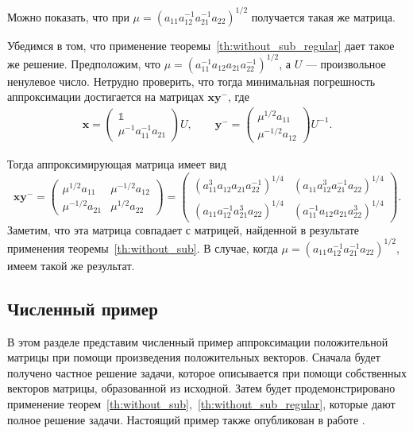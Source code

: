 \documentclass[specialist,
               substylefile = spbu.rtx,
               subf,href,colorlinks=true, 12pt]{disser}
\theoremstyle{definition}
\begin{document}
Можно показать, что при $\mu=(a_{11}a_{12}^{-1}a_{21}^{-1}a_{22})^{1/2}$ получается такая же матрица.

Убедимся в том, что применение теоремы~\ref{th:without_sub_regular} дает такое же решение. Предположим, что $\mu=(a_{11}^{-1}a_{12}a_{21}a_{22}^{-1})^{1/2}$, а $U$ --- произвольное ненулевое число. Нетрудно проверить, что тогда минимальная погрешность аппроксимации достигается на матрицах $\bm{x}\bm{y}^{-}$, где
\begin{gather*}
\bm{x}
=
\begin{pmatrix}
\mathbb{1}
\\
\mu^{-1}a_{11}^{-1}a_{21}
\end{pmatrix}
U,
\qquad
\bm{y}^{-}
=
\begin{pmatrix}
\mu^{1/2}a_{11}
\\
\mu^{-1/2}a_{12}
\end{pmatrix}
U^{-1}.
\end{gather*}

Тогда аппроксимирующая матрица имеет вид
\begin{equation*}
\bm{x}\bm{y}^{-}
=
\begin{pmatrix}
\mu^{1/2} a_{11} &\mu^{-1/2}a_{12}
\\
\mu^{-1/2}a_{21} &\mu^{1/2} a_{22}
\end{pmatrix}
=
\begin{pmatrix}
(a_{11}^{3}a_{12}a_{21}a_{22}^{-1})^{1/4} 
&(a_{11}a_{12}^{3}a_{21}^{-1}a_{22})^{1/4}
\\
(a_{11}a_{12}^{-1}a_{21}^{3}a_{22})^{1/4} 
&(a_{11}^{-1}a_{12}a_{21}a_{22}^{3})^{1/4}
\end{pmatrix}.
\end{equation*}
Заметим, что эта матрица совпадает с матрицей, найденной в результате применения теоремы~\ref{th:without_sub}. В случае, когда $\mu=(a_{11}a_{12}^{-1}a_{21}^{-1}a_{22})^{1/2}$, имеем такой же результат.

\subsection{Численный пример}
В этом разделе представим численный пример аппроксимации положительной матрицы при помощи произведения положительных векторов. Сначала будет получено частное решение задачи, которое описывается при помощи собственных векторов матрицы, образованной из исходной. Затем будет продемонстрировано применение теорем~\ref{th:without_sub},~\ref{th:without_sub_regular},  которые дают полное решение задачи. Настоящий пример также опубликован в работе \cite{Krivulin2018Rankone}.
\end{document}
